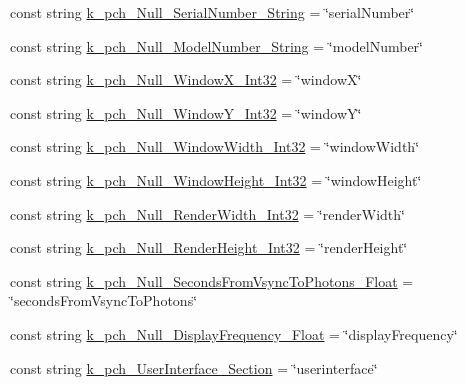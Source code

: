 \begin{DoxyCompactItemize}
const string \mbox{\hyperlink{class_valve_1_1_v_r_1_1_open_v_r_a71f3235c446f720b8716ed705ff24d35}{k\+\_\+pch\+\_\+\+Null\+\_\+\+Serial\+Number\+\_\+\+String}} = \char`\"{}serial\+Number\char`\"{}
\item 
const string \mbox{\hyperlink{class_valve_1_1_v_r_1_1_open_v_r_a02c53eeafcab9532053bd53562464759}{k\+\_\+pch\+\_\+\+Null\+\_\+\+Model\+Number\+\_\+\+String}} = \char`\"{}model\+Number\char`\"{}
\item 
const string \mbox{\hyperlink{class_valve_1_1_v_r_1_1_open_v_r_af68af7b2fba5a04606970ec50cfbc897}{k\+\_\+pch\+\_\+\+Null\+\_\+\+Window\+X\+\_\+\+Int32}} = \char`\"{}windowX\char`\"{}
\item 
const string \mbox{\hyperlink{class_valve_1_1_v_r_1_1_open_v_r_a45131be99968241f488b7b2231680695}{k\+\_\+pch\+\_\+\+Null\+\_\+\+Window\+Y\+\_\+\+Int32}} = \char`\"{}windowY\char`\"{}
\item 
const string \mbox{\hyperlink{class_valve_1_1_v_r_1_1_open_v_r_a4ccf27af7ed8b29d57001b33ee25377e}{k\+\_\+pch\+\_\+\+Null\+\_\+\+Window\+Width\+\_\+\+Int32}} = \char`\"{}window\+Width\char`\"{}
\item 
const string \mbox{\hyperlink{class_valve_1_1_v_r_1_1_open_v_r_a53ef8719f21c890e5276edf981e22be1}{k\+\_\+pch\+\_\+\+Null\+\_\+\+Window\+Height\+\_\+\+Int32}} = \char`\"{}window\+Height\char`\"{}
\item 
const string \mbox{\hyperlink{class_valve_1_1_v_r_1_1_open_v_r_a1a83716bba7258b7103385dc028ffcf6}{k\+\_\+pch\+\_\+\+Null\+\_\+\+Render\+Width\+\_\+\+Int32}} = \char`\"{}render\+Width\char`\"{}
\item 
const string \mbox{\hyperlink{class_valve_1_1_v_r_1_1_open_v_r_a3ee36c5f6f809389a3e62a34cff638ba}{k\+\_\+pch\+\_\+\+Null\+\_\+\+Render\+Height\+\_\+\+Int32}} = \char`\"{}render\+Height\char`\"{}
\item 
const string \mbox{\hyperlink{class_valve_1_1_v_r_1_1_open_v_r_a77e543713248a3dc7f7c53f34b279354}{k\+\_\+pch\+\_\+\+Null\+\_\+\+Seconds\+From\+Vsync\+To\+Photons\+\_\+\+Float}} = \char`\"{}seconds\+From\+Vsync\+To\+Photons\char`\"{}
\item 
const string \mbox{\hyperlink{class_valve_1_1_v_r_1_1_open_v_r_a1eec9c76a0a8a5a2696212023a74e9af}{k\+\_\+pch\+\_\+\+Null\+\_\+\+Display\+Frequency\+\_\+\+Float}} = \char`\"{}display\+Frequency\char`\"{}
\item 
const string \mbox{\hyperlink{class_valve_1_1_v_r_1_1_open_v_r_ad615a48f09fa13d48aa7ab0c8bfc0d53}{k\+\_\+pch\+\_\+\+User\+Interface\+\_\+\+Section}} = \char`\"{}userinterface\char`\"{}

\end{DoxyCompactItemize}
